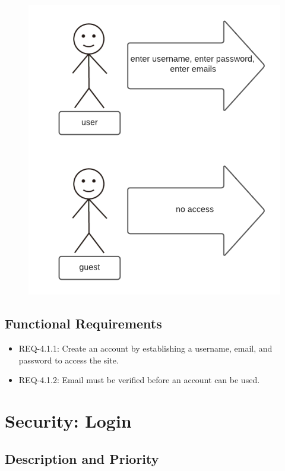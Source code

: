 \documentclass{scrreprt}
\begin{document}
\begin{figure}[H]\centering
    \includegraphics[width=\columnwidth]{response diagrams/Account.png}
\end{figure}

\subsection{\gls{Functional Requirements}}

\begin{itemize}
    \item REQ-4.1.1: Create an account by establishing a username, email, and password to access the site.
    \item REQ-4.1.2: Email must be verified before an account can be used.
\end{itemize}

\section{Security: Login}

\subsection{Description and Priority}
\end{document}
